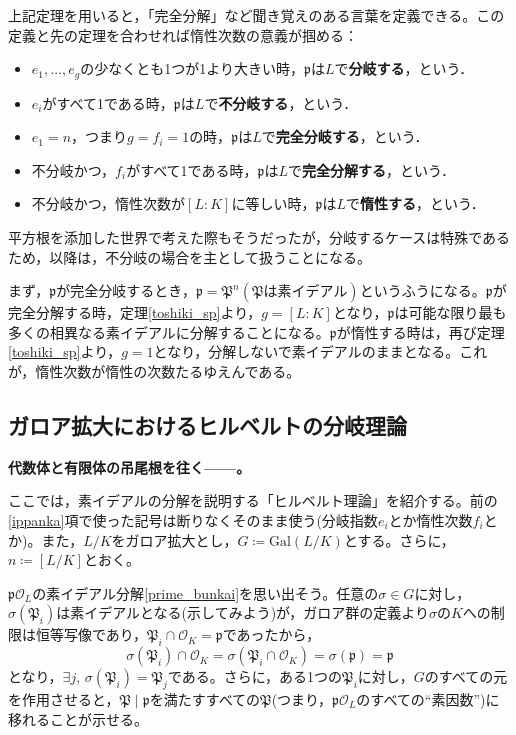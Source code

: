 上記定理を用いると，「完全分解」など聞き覚えのある言葉を定義できる。この定義と先の定理を合わせれば惰性次数の意義が掴める：
\begin{dfn}[聞き覚えのある用語+「分岐」]
    \begin{itemize}
        \item $e_1,\ldots,e_g$の少なくとも1つが1より大きい時，$\mathfrak{p}$は$L$で\textbf{分岐する}，という．
        \item $e_i$がすべて1である時，$\mathfrak{p}$は$L$で\textbf{不分岐する}，という．
        \item $e_1=n$，つまり$g=f_i=1$の時，$\mathfrak{p}$は$L$で\textbf{完全分岐する}，という．
        \item 不分岐かつ，$f_i$がすべて1である時，$\mathfrak{p}$は$L$で\textbf{完全分解する}，という．
        \item 不分岐かつ，惰性次数が$[L:K]$に等しい時，$\mathfrak{p}$は$L$で\textbf{惰性する}，という．
    \end{itemize}
\end{dfn}
平方根を添加した世界で考えた際もそうだったが，分岐するケースは特殊であるため，以降は，不分岐の場合を主として扱うことになる。

まず，$\mathfrak{p}$が完全分岐するとき，$\mathfrak{p}=\mathfrak{P}^{n}(\mathfrak{P}\text{は素イデアル})$というふうになる。$\mathfrak{p}$が完全分解する時，定理\ref{toshiki_sp}より，$g=[L:K]$となり，$\mathfrak{p}$は可能な限り最も多くの相異なる素イデアルに分解することになる。$\mathfrak{p}$が惰性する時は，再び定理\ref{toshiki_sp}より，$g=1$となり，分解しないで素イデアルのままとなる。これが，惰性次数が惰性の次数たるゆえんである。

\subsection{ガロア拡大におけるヒルベルトの分岐理論}
\textbf{代数体と有限体の吊尾根を往く------。}

\vspace{10pt}

ここでは，素イデアルの分解を説明する「ヒルベルト理論」を紹介する。前の\ref{ippanka}項で使った記号は断りなくそのまま使う(分岐指数$e_i$とか惰性次数$f_i$とか)。また，$L/K$をガロア拡大とし，$G\coloneqq\mathrm{Gal}(L/K)$とする。さらに，$n\coloneqq [L/K]$とおく。

$\mathfrak{p}\mathcal{O}_L$の素イデアル分解\eqref{prime_bunkai}を思い出そう。任意の$\sigma\in G$に対し，$\sigma(\mathfrak{P}_i)$は素イデアルとなる(示してみよう)が，ガロア群の定義より$\sigma$の$K$への制限は恒等写像であり，$\mathfrak{P}_i\cap\mathcal{O}_K=\mathfrak{p}$であったから，\[
\sigma(\mathfrak{P}_i)\cap\mathcal{O}_K=\sigma(\mathfrak{P}_i\cap\mathcal{O}_K)=\sigma(\mathfrak{p})=\mathfrak{p}
\]となり，$\exists j,\,\sigma(\mathfrak{P}_i)=\mathfrak{P}_j$である。さらに，ある1つの$\mathfrak{P}_i$に対し，$G$のすべての元を作用させると，$\mathfrak{P}\mid\mathfrak{p}$を満たすすべての$\mathfrak{P}$(つまり，$\mathfrak{p}\mathcal{O}_L$のすべての``素因数'')に移れることが示せる。

